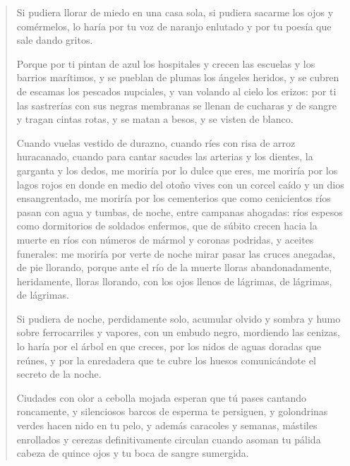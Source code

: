 \documentclass[12pt]{article}
\begin{document}
\clearpage
{}
\begin{verse}
Si pudiera llorar de miedo en una casa sola,  
si pudiera sacarme los ojos y comérmelos,  
lo haría por tu voz de naranjo enlutado  
y por tu poesía que sale dando gritos.  
	
Porque por ti pintan de azul los hospitales  
y crecen las escuelas y los barrios marítimos,  
y se pueblan de plumas los ángeles heridos,  
y se cubren de escamas los pescados nupciales,  
y van volando al cielo los erizos:  
por ti las sastrerías con sus negras membranas  
se llenan de cucharas y de sangre  
y tragan cintas rotas, y se matan a besos,  
y se visten de blanco.  
	
Cuando vuelas vestido de durazno,  
cuando ríes con risa de arroz huracanado,  
cuando para cantar sacudes las arterias y los dientes,  
la garganta y los dedos,  
me moriría por lo dulce que eres,  
me moriría por los lagos rojos  
en donde en medio del otoño vives  
con un corcel caído y un dios ensangrentado,  
me moriría por los cementerios  
que como cenicientos ríos pasan  
con agua y tumbas,  
de noche, entre campanas ahogadas:  
ríos espesos como dormitorios  
de soldados enfermos, que de súbito crecen  
hacia la muerte en ríos con números de mármol  
y coronas podridas, y aceites funerales:  
me moriría por verte de noche  
mirar pasar las cruces anegadas,  
de pie llorando,  
porque ante el río de la muerte lloras  
abandonadamente, heridamente,  
lloras llorando, con los ojos llenos  
de lágrimas, de lágrimas, de lágrimas.  
	
Si pudiera de noche, perdidamente solo,  
acumular olvido y sombra y humo  
sobre ferrocarriles y vapores,  
con un embudo negro,  
mordiendo las cenizas,  
lo haría por el árbol en que creces,  
por los nidos de aguas doradas que reúnes,  
y por la enredadera que te cubre los huesos  
comunicándote el secreto de la noche.  
	
Ciudades con olor a cebolla mojada  
esperan que tú pases cantando roncamente,  
y silenciosos barcos de esperma te persiguen,  
y golondrinas verdes hacen nido en tu pelo,  
y además caracoles y semanas,  
mástiles enrollados y cerezas  
definitivamente circulan cuando asoman  
tu pálida cabeza de quince ojos  
y tu boca de sangre sumergida.  
	

\end{verse}
\end{document}
